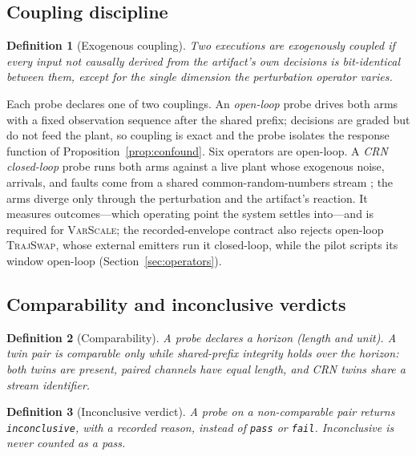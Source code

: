 \documentclass[conference]{IEEEtran}
\newtheorem{definition}{Definition}
\begin{document}
	\subsection{Coupling discipline}
	
	\begin{definition}[Exogenous coupling]
		Two executions are exogenously coupled if every input not causally derived
		from the artifact's own decisions is bit-identical between them, except for
		the single dimension the perturbation operator varies.
	\end{definition}
	
	Each probe declares one of two couplings. An \emph{open-loop} probe drives
	both arms with a fixed observation sequence after the shared prefix;
	decisions are graded but do not feed the plant, so coupling is exact and
	the probe isolates the response function of
	Proposition~\ref{prop:confound}. Six operators are open-loop. A
	\emph{CRN closed-loop} probe runs both arms against a live plant whose
	exogenous noise, arrivals, and faults come from a shared
	common-random-numbers stream \cite{glasserman1992}; the arms diverge only
	through the perturbation and the artifact's reaction. It measures
	outcomes---which operating point the system settles into---and is
	required for \textsc{VarScale}; the recorded-envelope contract also
	rejects open-loop \textsc{TrajSwap}, whose external emitters run it
	closed-loop, while the pilot scripts its window open-loop
	(Section~\ref{sec:operators}).
	
	\subsection{Comparability and inconclusive verdicts}
	
	\begin{definition}[Comparability]
		\label{def:horizon}
		A probe declares a horizon (length and unit). A twin pair is
		\emph{comparable} only while shared-prefix integrity holds over the
		horizon: both twins are present, paired channels have equal length,
		and CRN twins share a stream identifier.
	\end{definition}
	
	\begin{definition}[Inconclusive verdict]
		\label{def:inconclusive}
		A probe on a non-comparable pair returns \texttt{inconclusive}, with a
		recorded reason, instead of \texttt{pass} or \texttt{fail}. Inconclusive
		is never counted as a pass.
	\end{definition}
	
\end{document}

